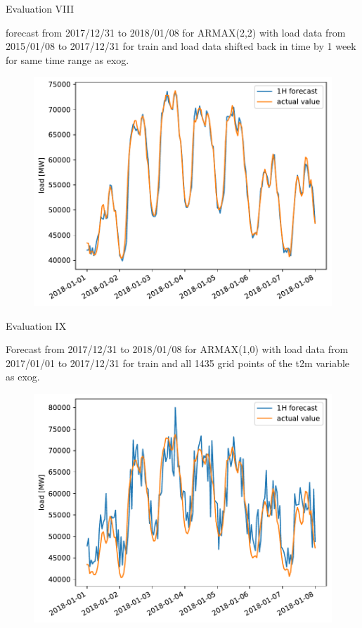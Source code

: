 \documentclass[t,xcolor={table},fleqn]{beamer}
\begin{document}
\begin{frame}{Evaluation VIII}

forecast from 2017/12/31 to 2018/01/08 for ARMAX(2,2) with load data from 2015/01/08 to 2017/12/31 for train and load data shifted back in time by 1 week for same time range as exog.

\begin{figure}[h!]%
\centering
\includegraphics[height=.8\textheight]{../doc/plots/ARMAXfc/ARMAX_p2q2_data2015to2017_fcto2018123100_load_lag_plot_range2018010100_2018010800}%
\end{figure}%

\end{frame}

\begin{frame}{Evaluation IX}

Forecast from 2017/12/31 to 2018/01/08 for ARMAX(1,0) with load data from 2017/01/01 to 2017/12/31 for train and all 1435 grid points of the t2m variable as exog.

\begin{figure}[h!]%
\centering
\includegraphics[height=.8\textheight]{../doc/plots/ARMAXfc/ARMAX_p1q0_data2017010100to2017123100_fc2017123101to2018010800_t2m_all}%
\end{figure}%

\end{frame}
\end{document}
